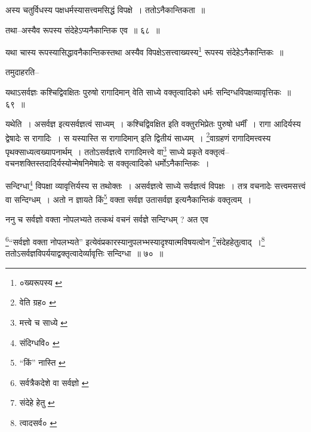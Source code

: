 \documentclass[article,12pt,a4paper]{memoir}
\begin{document}
	  \pstart अस्य चतुर्विधस्य पक्षधर्मस्यासत्त्वमसिद्धं विपक्षे । ततोऽनैकान्तिकता ॥
	\pend
       
	  \bigskip
	  \begingroup
	

	  \pstart तथा--अस्यैव रूपस्य संदेहेऽप्यनैकान्तिक एव ॥ ६८ ॥
	\pend
      
	  \endgroup
	 

	  \pstart यथा चास्य रूपस्यासिद्धावनैकान्तिकस्तथा अस्यैव विपक्षेऽसत्त्वाख्यस्य\footnote{०ख्यरूपस्य \cite{dp-msC}} रूपस्य संदेहेऽनैकान्तिकः ॥
	\pend
       

	  \pstart तमुदाहरति--
	\pend
       
	  \bigskip
	  \begingroup
	

	  \pstart यथाऽसर्वज्ञः कश्चिद्विवक्षितः पुरुषो रागादिमान् वेति साध्ये वक्तृत्वादिको धर्मः सन्दिग्धविपक्षव्यावृत्तिकः ॥ ६९ ॥
	\pend
      
	  \endgroup
	 

	  \pstart यथेति । असर्वज्ञ इत्यसर्वज्ञत्वं साध्यम् । कश्चिद्विवक्षित इति वक्तुरभिप्रेतः पुरुषो धर्मीं । रागा आदिर्यस्य द्वेषादेः स रागादिः । स यस्यास्ति स रागादिमान् इति द्वितीयं साध्यम् । \footnote{वेति ग्रह० \cite{dp-msC} \cite{dp-msD}}\-वाग्रहणं रागादिमत्त्वस्य पृथक्साध्यत्वख्यापनार्थम् । ततोऽसर्वज्ञत्वे रागादिमत्त्वे वा\footnote{मत्त्वे च साध्ये \cite{dp-msC}} साध्ये प्रकृते वक्तृत्वं--वचनशक्तिस्तदादिर्यस्योन्मेषनिमेषादेः स वक्तृत्वादिको धर्मोऽनैकान्तिकः ।
	\pend
       

	  \pstart सन्दिग्धा\footnote{संदिग्धवि० \cite{dp-msB}} विपक्षा व्यावृत्तिर्यस्य स तथोक्तः । असर्वज्ञत्वे साध्ये सर्वज्ञत्वं विपक्षः । तत्र वचनादेः सत्त्वमसत्त्वं वा सन्दिग्धम् । अतो न ज्ञायते किं\footnote{“किं” नास्ति \cite{dp-msA} \cite{dp-msB} \cite{dp-msD} \cite{dp-edP} \cite{dp-edH} \cite{dp-edE} \cite{dp-edN}} वक्ता सर्वज्ञ उतासर्वज्ञ इत्यनैकान्तिकं वक्तृत्वम् ।
	\pend
       

	  \pstart ननु च सर्वज्ञो वक्ता नोपलभ्यते तत्कथं वचनं सर्वज्ञे सन्दिग्धम् ? अत एव
	\pend
       
	  \bigskip
	  \begingroup
	

	  \pstart \footnote{सर्वत्रैकदेशे वा सर्वज्ञो \cite{dp-msB} \cite{dp-edP} \cite{dp-edH}}“सर्वज्ञो वक्ता नोपलभ्यते” इत्येवंप्रकारस्यानुपलभ्भस्यादृश्यात्मविषयत्वोन \footnote{संदेहे हेतु \cite{dp-msB} \cite{dp-edP} \cite{dp-edH} \cite{dp-edE}}\-संदेहहेतुत्वाद् ।\footnote{त्वादसर्व० \cite{dp-msB} \cite{dp-msD} \cite{dp-edP} \cite{dp-edH} \cite{dp-edE}} ततोऽसर्वज्ञविपर्ययाद्वक्तृत्वादेर्व्यावृत्तिः सन्दिग्धा ॥ ७० ॥
	\pend
      
	  \endgroup
	 
\end{document}
